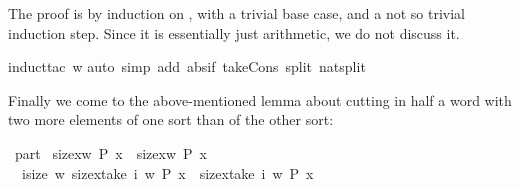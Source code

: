 \begin{isabellebody}
\begin{isamarkuptxt}
The proof is by induction on , with a trivial base case, and a not
so trivial induction step. Since it is essentially just arithmetic, we do not
discuss it.%
\end{isamarkuptxt}%
\isamarkuptrue%
\isamarkupfalse%
{}induct{}tac\ w{}\isanewline
{}\isamarkupfalse%
{}auto\ simp\ add{}\ abs{}if\ take{}Cons\ split{}\ nat{}split{}\isanewline
{}\isamarkupfalse%
%
\endisatagproof
{\isafoldproof}%
%
\isadelimproof
%
\endisadelimproof
%
\begin{isamarkuptext}%
Finally we come to the above-mentioned lemma about cutting in half a word with two more elements of one sort than of the other sort:%
\end{isamarkuptext}%
\isamarkuptrue%
\isamarkupfalse%
\ part{}{}\isanewline
\ {}size{}x{}w{}\ P\ x{}\ {}\ size{}x{}w{}\ {}P\ x{}{}{}\ {}\isanewline
\ \ {}i{}size\ w{}\ size{}x{}take\ i\ w{}\ P\ x{}\ {}\ size{}x{}take\ i\ w{}\ {}P\ x{}{}{}{}%
\isadelimproof
%
\endisadelimproof
%
\isatagproof
%
\begin{isamarkuptxt}%
\noindent

\end{isamarkuptxt}
\end{isabellebody}
